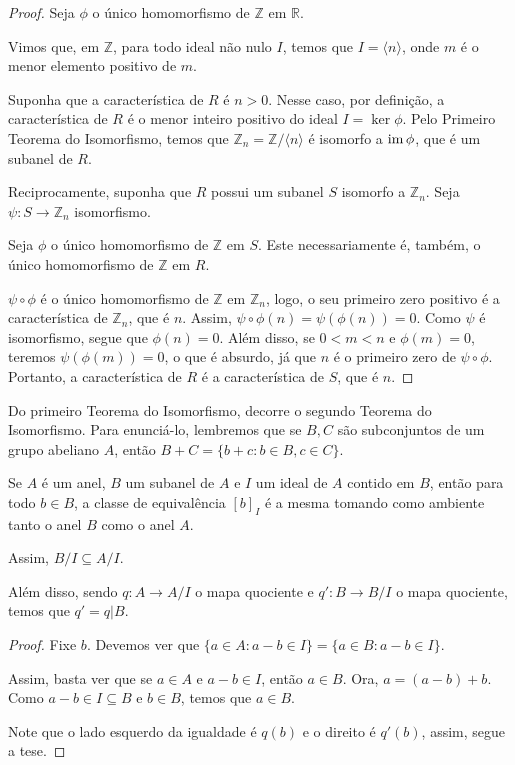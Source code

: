 \begin{proof}
Seja $\phi$ o único homomorfismo de $\mathbb Z$ em $\mathbb R$.

Vimos que, em $\mathbb Z$, para todo ideal não nulo $I$, temos que $I=\langle n\rangle$, onde $m$ é o menor elemento positivo de $m$.

Suponha que a característica de $R$ é $n>0$.
Nesse caso, por definição, a característica de $R$ é o menor inteiro positivo do ideal $I=\ker \phi$.
Pelo Primeiro Teorema do Isomorfismo, temos que $\mathbb Z_n=\mathbb Z/\langle n\rangle$ é isomorfo a $\operatorname{im} \phi$, que é um subanel de $R$.

Reciprocamente, suponha que $R$ possui um subanel $S$ isomorfo a $\mathbb Z_n$.
Seja $\psi:S\rightarrow \mathbb Z_n$ isomorfismo.

Seja $\phi$ o único homomorfismo de $\mathbb Z$ em $S$.
Este necessariamente é, também, o único homomorfismo de $\mathbb Z$ em $R$.

$\psi\circ \phi$ é o único homomorfismo de $\mathbb Z$ em $\mathbb Z_n$, logo, o seu primeiro zero positivo é a característica de $\mathbb Z_n$, que é $n$.
Assim, $\psi\circ\phi(n)=\psi(\phi(n))=0$.
Como $\psi$ é isomorfismo, segue que $\phi(n)=0$.
Além disso, se $0<m<n$ e $\phi(m)=0$, teremos $\psi(\phi(m))=0$, o que é absurdo, já que $n$ é o primeiro zero de $\psi\circ \phi$.
Portanto, a característica de $R$ é a característica de $S$, que é $n$.
\end{proof}

Do primeiro Teorema do Isomorfismo, decorre o segundo Teorema do Isomorfismo.
Para enunciá-lo, lembremos que se $B, C$ são subconjuntos de um grupo abeliano $A$, então $B+C=\{b+c: b \in B, c \in C\}$.

\begin{lemma}
Se $A$ é um anel, $B$ um subanel de $A$ e $I$ um ideal de $A$ contido em $B$, então para todo $b\in B$, a classe de equivalência $[b]_I$ é a mesma tomando como ambiente tanto o anel $B$ como o anel $A$.

Assim, $B/I\subseteq A/I$.

Além disso, sendo $q:A\rightarrow A/I$ o mapa quociente e $q':B\rightarrow B/I$ o mapa quociente, temos que $q'=q|B$.
\end{lemma}

\begin{proof}
    Fixe $b$.
    Devemos ver que $\{a \in A: a-b\in I\}=\{a \in B: a-b\in I\}$.

    Assim, basta ver que se $a \in A$ e $a-b \in I$, então $a \in B$.
    Ora, $a=(a-b)+b$.
    Como $a-b \in I\subseteq B$ e $b \in B$, temos que $a \in B$.

    Note que o lado esquerdo da igualdade é $q(b)$ e o direito é $q'(b)$, assim, segue a tese.
\end{proof}

